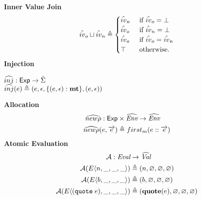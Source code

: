 \documentclass[12pt,draft]{article}
\newcommand{\quotesyn}[1]{(\texttt{quote}\;#1)}
\newcommand{\E}[4]{E\langle #1 , #2 , #3 , #4 \rangle}
\begin{document}
\begin{multicols*}{2}
\begin{align*}
  \end{align*}
  \textbf{Inner Value Join} \\
  \vspace{-3mm}
  \[
    \hat{iv}_o \sqcup \hat{iv}_n \triangleq
    \begin{cases}
      \hat{iv}_n & \text{ if } \hat{iv}_o = \bot \\
      \hat{iv}_o & \text{ if } \hat{iv}_n = \bot \\
      \hat{iv}_o & \text{ if } \hat{iv}_o = \hat{iv}_n \\
      \top & \text{ otherwise.}
    \end{cases}
  \]
  \vfill\null
  \columnbreak
  \noindent \textbf{Injection} \\
  \vspace{-7mm}
  \begin{center}
    $\widehat{inj} : \textsf{Exp} \rightarrow \hat{\Sigma}$ \\
    $\widehat{inj}(e) \triangleq
    (e , \epsilon , \{(e , \epsilon) : \textbf{mt}\} , (e , \epsilon))$
  \end{center}
  \textbf{Allocation} \\
  \vspace{-3mm}
  \begin{align*}
    \widehat{new\rho} : \textsf{Exp} &\times \widehat{\textit{Env}} \rightarrow \widehat{\textit{Env}} \\
    \widehat{new\rho}(e , \overrightarrow{e}) &\triangleq first_m(e::\overrightarrow{e})
  \end{align*}
  \textbf{Atomic Evaluation} \\
  \vspace{-3mm}
  \begin{align*}
    \mathcal{A} : \textit{Eval} &\rightarrow \aVal \\
    \mathcal{A}(\E{n}{\_}{\_}{\_}) &\triangleq (n , \varnothing ,
                                     \varnothing , \varnothing) \\
    \mathcal{A}(\E{b}{\_}{\_}{\_}) &\triangleq (b , \varnothing ,
                                     \varnothing , \varnothing) \\
    \mathcal{A}(\E{\quotesyn{e}}{\_}{\_}{\_}) &\triangleq
                                                (\textbf{quote}(e) , \varnothing ,
                                                \varnothing , \varnothing) \\

\end{align*}
\end{multicols*}
\end{document}
